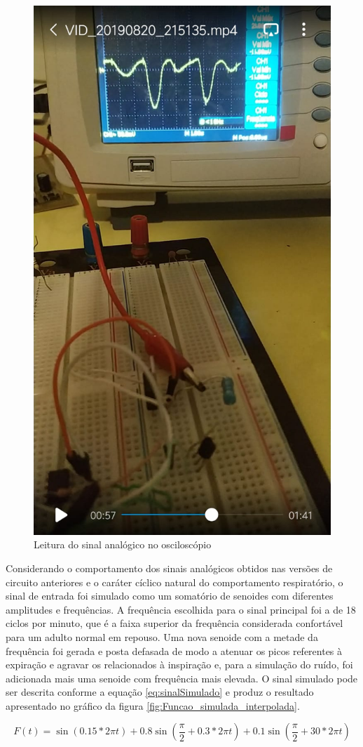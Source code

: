 \begin{figure}[h!]
	\begin{center}
		\includegraphics[width=0.5\linewidth]{images/ComportamentoSinalAnalogico.jpeg}
		\caption{Leitura do sinal analógico no osciloscópio}
		\label{fig:ComportamentoSinalAnalogico}
	\end{center}
\end{figure}

Considerando o comportamento dos sinais analógicos obtidos nas versões de circuito anteriores e o caráter cíclico natural do comportamento respiratório, o sinal de entrada foi simulado como um somatório de senoides com diferentes amplitudes e frequências. A frequência escolhida para o sinal principal foi a de 18 ciclos por minuto, que é a faixa superior da frequência considerada confortável para um adulto normal em repouso. Uma nova senoide com a metade da frequência foi gerada e posta defasada de modo a atenuar os picos referentes à expiração e agravar os relacionados à inspiração e, para a simulação do ruído, foi adicionada mais uma senoide com frequência mais elevada. O sinal simulado pode ser descrita conforme a equação \ref{eq:sinalSimulado} e produz o resultado apresentado no gráfico da figura \ref{fig:Funcao_simulada_interpolada}.

\begin{equation} \label{eq:sinalSimulado}
	F(t) =  \sin(0.15 * 2\pi t)  + 0.8\sin(\dfrac{\pi}{2} + 0.3 * 2\pi t) + 0.1\sin(\dfrac{\pi}{2} + 30 * 2\pi t)
\end{equation}


